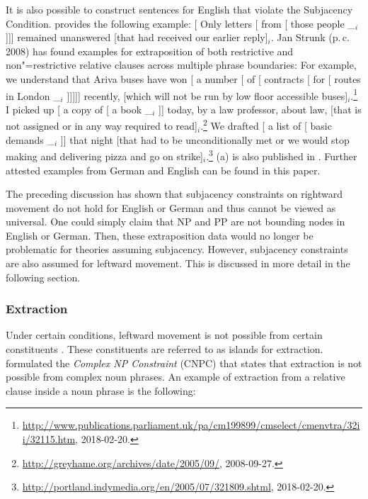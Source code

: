 \noindent
It is also possible to construct sentences for English that violate the Subjacency Condition.
\citet[]{Uszkoreit90a} provides the following example:
\ea
{}[ Only letters [ from [ those people \_$_i$]]] remained
unanswered [that had received our earlier reply]$_i$.
\z
%
Jan Strunk (p.\,c.\, 2008) has found examples for extraposition of both restrictive
and non"=restrictive relative clauses across multiple phrase boundaries:
\eal
\ex For example, we understand that Ariva buses have won [ a number [ of [
      contracts [ for [ routes in London \_$_i$ ]]]]] recently, [which will not be run
by low floor accessible buses]$_i$.\footnote{%
\url{http://www.publications.parliament.uk/pa/cm199899/cmselect/cmenvtra/32ii/32115.htm},
2018-02-20.
}
\ex I picked up [ a copy of [ a book \_$_i$ ]] today, by a law
professor, about law, [that is not assigned or in any way required to read]$_i$.\footnote{%
\url{http://greyhame.org/archives/date/2005/09/}, 2008-09-27.
}
\ex We drafted [ a list of [ basic demands \_$_i$ ]] that night [that had to be
  unconditionally met or we would stop making and 
delivering pizza and go on strike]$_i$.\footnote{%
\url{http://portland.indymedia.org/en/2005/07/321809.shtml}, 2018-02-20.
}
\zl
(a) is also published in . Further attested examples from German and
English can be found in this paper.

The preceding discussion has shown that subjacency constraints on rightward movement do not hold for English or German and thus cannot be
viewed as universal. One could simply claim that NP and PP are not bounding nodes in English or German. Then, these extraposition data would
no longer be problematic for theories assuming subjacency. However, subjacency constraints are also
assumed for leftward movement. This is discussed in more detail in the following section. 

\subsubsection{Extraction}
\label{Abschnitt-Subjazenz-Extraktion}

Under certain conditions, leftward movement is not possible from certain constituents \citep{Ross67a}. 
These constituents are referred to as islands for
extraction. \citet[Section~4.1]{Ross67a} formulated the \emph{Complex NP
  Constraint} (CNPC) that states that extraction is not possible from complex noun phrases. An example of extraction
  from a relative clause inside a noun phrase is the following:

